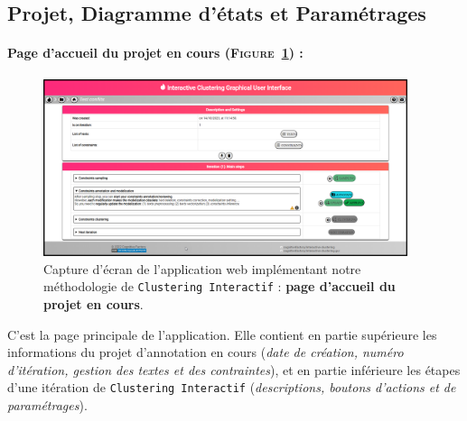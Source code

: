 	
	\newpage
	\subsection{Projet, Diagramme d'états et Paramétrages}
	\label{annex:C.2.2-DESCRIPTION-IMPLEMENTATION-INTERACTIVE-CLUSTERING-GUI-PROJET}
	
		\paragraph{Page d'accueil du projet en cours (\textsc{Figure~\ref{figure:C-WEB-APPLICATION-ACCUEIL-PROJET}}) :}
			
			\begin{figure}[H]
				\centering
				\includegraphics[width=0.95\textwidth]{figures/interactive-clustering-application-accueil-projet}
				\caption{
					Capture d'écran de l'application web implémentant notre méthodologie de \texttt{Clustering Interactif} : \textbf{page d'accueil du projet en cours}.
				}
				\label{figure:C-WEB-APPLICATION-ACCUEIL-PROJET}
			\end{figure}
			
			C'est la page principale de l'application.
			Elle contient en partie supérieure les informations du projet d'annotation en cours (\textit{date de création, numéro d'itération, gestion des textes et des contraintes}), et en partie inférieure les étapes d'une itération de \texttt{Clustering Interactif} (\textit{descriptions, boutons d'actions et de paramétrages}).
			
